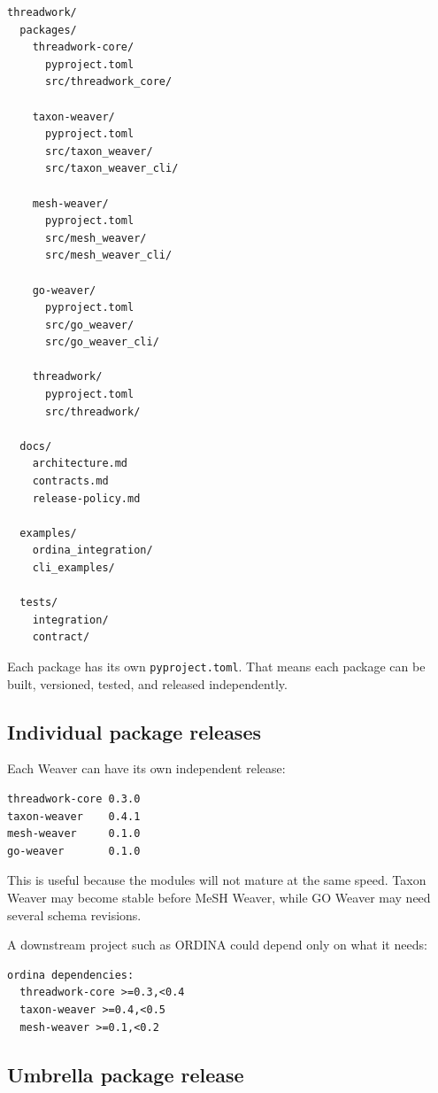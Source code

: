 \documentclass[11pt,a4paper]{article}
\newcommand{\code}[1]{\texttt{#1}}
\begin{document}
\begin{Verbatim}[fontsize=\small]
threadwork/
  packages/
    threadwork-core/
      pyproject.toml
      src/threadwork_core/

    taxon-weaver/
      pyproject.toml
      src/taxon_weaver/
      src/taxon_weaver_cli/

    mesh-weaver/
      pyproject.toml
      src/mesh_weaver/
      src/mesh_weaver_cli/

    go-weaver/
      pyproject.toml
      src/go_weaver/
      src/go_weaver_cli/

    threadwork/
      pyproject.toml
      src/threadwork/

  docs/
    architecture.md
    contracts.md
    release-policy.md

  examples/
    ordina_integration/
    cli_examples/

  tests/
    integration/
    contract/
\end{Verbatim}

Each package has its own \code{pyproject.toml}. That means each package can be built, versioned, tested, and released independently.

\subsection{Individual package releases}

Each Weaver can have its own independent release:

\begin{Verbatim}[fontsize=\small]
threadwork-core 0.3.0
taxon-weaver    0.4.1
mesh-weaver     0.1.0
go-weaver       0.1.0
\end{Verbatim}

This is useful because the modules will not mature at the same speed. Taxon Weaver may become stable before MeSH Weaver, while GO Weaver may need several schema revisions.

A downstream project such as ORDINA could depend only on what it needs:

\begin{Verbatim}[fontsize=\small]
ordina dependencies:
  threadwork-core >=0.3,<0.4
  taxon-weaver >=0.4,<0.5
  mesh-weaver >=0.1,<0.2
\end{Verbatim}

\subsection{Umbrella package release}
\end{document}
